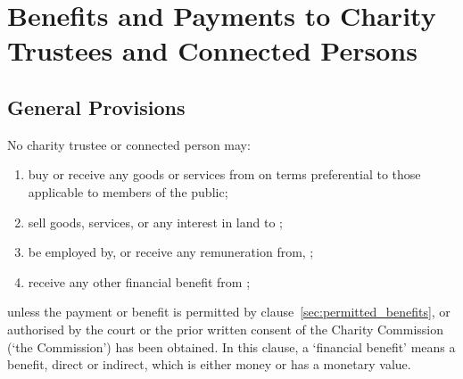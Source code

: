 \section{Benefits and Payments to Charity Trustees and Connected Persons}\label{sec:benefits}
    \subsection{General Provisions}
    No charity trustee or connected person may:
    \begin{enumerate}
        \item buy or receive any goods or services from \shortname{} on terms preferential to those applicable to members of the public;
        \item sell goods, services, or any interest in land to \shortname{};
        \item be employed by, or receive any remuneration from, \shortname{};
        \item receive any other financial benefit from \shortname{};
    \end{enumerate}
    unless the payment or benefit is permitted by clause~\ref{sec:permitted_benefits}, or authorised by the court or the prior written consent of the Charity Commission (`the Commission') has been obtained. In this clause, a `financial benefit' means a benefit, direct or indirect, which is either money or has a monetary value.

